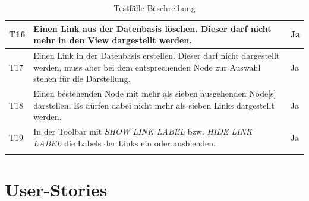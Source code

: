\begin{longtable}{|p{1cm} | p{10cm} |p{1.2cm} |}
    T16 & Einen Link aus der Datenbasis löschen. Dieser darf nicht mehr in den \gls{View} dargestellt werden. &Ja\\\hline
    T17 & Einen Link in der Datenbasis erstellen. Dieser darf nicht dargestellt werden, muss aber bei dem entsprechenden \gls{Node} zur Auswahl stehen für die Darstellung. & Ja\\\hline
    T18 & Einen bestehenden \gls{Node} mit mehr als sieben ausgehenden \gls{Node}[s] darstellen. Es dürfen dabei nicht mehr als sieben Links dargestellt werden. & Ja\\\hline
    T19 & In der Toolbar mit \textit{SHOW LINK LABEL} bzw. \textit{HIDE LINK LABEL} die Labels der Links ein oder ausblenden. & Ja\\\hline
    \caption{Testfälle Beschreibung}
  \label{tab:testkonzept-detail}
\end{longtable}



\section{User-Stories}

